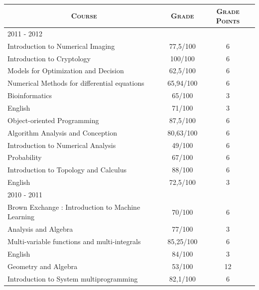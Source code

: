 \documentclass[a4paper,10pt]{article} %
\begin{document}
\begin{center}
\begin{tabular}{lcc}
\multicolumn{1}{c}{\textsc{Course}} & \textsc{Grade} & \textsc{Grade Points}\\
\hline
\textsc{2011 - 2012} & & \\
\hline
Introduction to Numerical Imaging                          &  77,5/100 & 6     \\
Introduction to Cryptology                                 &   100/100 & 6     \\
Models for Optimization and Decision                       &  62,5/100 & 6     \\
Numerical Methods for differential equations               & 65,94/100 & 6     \\
Bioinformatics                                             &    65/100 & 3     \\
English                                                    &    71/100 & 3     \\
\hline
Object-oriented Programming                                &  87,5/100 & 6     \\
Algorithm Analysis and Conception                          & 80,63/100 & 6     \\
Introduction to Numerical Analysis                         &    49/100 & 6     \\
Probability                                                &    67/100 & 6     \\
Introduction to Topology and Calculus                      &    88/100 & 6     \\
English                                                    &  72,5/100 & 3     \\
\hline
\textsc{2010 - 2011} & & \\
\hline
Brown Exchange : Introduction to Machine Learning          &    70/100 & 6     \\
Analysis and Algebra                                       &    77/100 & 3     \\
Multi-variable functions and multi-integrals               & 85,25/100 & 6     \\
English                                                    &    84/100 & 3     \\
\hline
Geometry and Algebra                                       &    53/100 & 12    \\
Introduction to System multiprogramming                    &  82,1/100 & 6     \\

\end{tabular}
\end{center}
\end{document}
